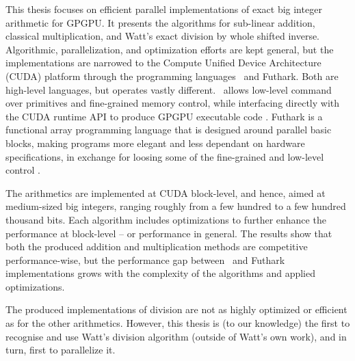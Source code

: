 This thesis focuses on efficient parallel implementations of exact big integer
arithmetic for GPGPU. It presents the algorithms for sub-linear addition,
classical multiplication, and Watt's exact division by whole shifted
inverse. Algorithmic, parallelization, and optimization efforts are kept
general, but the implementations are narrowed to the Compute Unified Device
Architecture (CUDA) platform through the programming languages \cpp\ and
Futhark. Both are high-level languages, but operates vastly different. \cpp\
allows low-level command over primitives and fine-grained memory control, while
interfacing directly with the CUDA runtime API to produce GPGPU executable code
\cite{cudaguide, stroustrup}. Futhark is a functional array programming language
that is designed around parallel basic blocks, making programs more elegant and
less dependant on hardware specifications, in exchange for loosing some of the
fine-grained and low-level control \cite{ParallelProgrammingInFuthark,
  Henriksen:2017:FPF:3062341.3062354}.

The arithmetics are implemented at CUDA block-level, and hence, aimed at
medium-sized big integers, ranging roughly from a few hundred to a few hundred
thousand bits. Each algorithm includes optimizations to further enhance the
performance at block-level -- or performance in general. The results show that
both the produced addition and multiplication methods are competitive
performance-wise, but the performance gap between \cpp\ and Futhark
implementations grows with the complexity of the algorithms and applied
optimizations.

The produced implementations of division are not as highly optimized or
efficient as for the other arithmetics. However, this thesis is (to our
knowledge) the first to recognise and use Watt's division algorithm (outside of
Watt's own work), and in turn, first to parallelize it.

